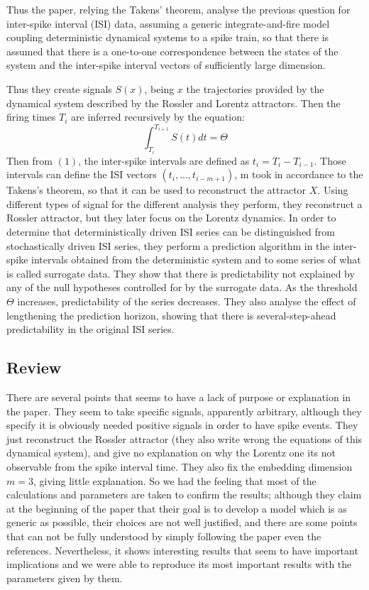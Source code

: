 \documentclass[10pt]{article}
\begin{document}
Thus the paper, relying the Takens' theorem, analyse the previous question for inter-spike interval (ISI) data, assuming a generic integrate-and-fire model coupling deterministic dynamical systems to a spike train, so that there is assumed that there is a one-to-one correspondence between the states of the system and the inter-spike interval vectors of sufficiently large dimension. 

Thus they create signals $S(x)$, being $x$ the trajectories provided by the dynamical system described by the Rossler and Lorentz attractors. Then the firing times $T_i$ are inferred recursively by the equation:
\begin{equation}
\int_{T_i}^{T_{i+1}} S(t)dt=\Theta
\end{equation}
Then from $(1)$, the inter-spike intervals are defined as $t_i = T_i - T_{i-1}$. Those intervals can define the ISI vectors $(t_i,...,t_{i-m+1})$, m took in accordance to the Takens's theorem, so that it can be used to reconstruct the attractor $X$. Using different types of signal for the different analysis they perform, they reconstruct a Rossler attractor, but they later focus on the Lorentz dynamics. In order to determine that deterministically driven ISI series can be distinguished from stochastically driven ISI series, they perform a prediction algorithm in the inter-spike intervals obtained from the deterministic system and to some series of what is called surrogate data. They show that there is predictability not explained by any of the null hypotheses controlled for by the surrogate data. As the threshold $\Theta$ increases, predictability of the series decreases. They also analyse the effect of lengthening the prediction horizon, showing that there is several-step-ahead predictability in the original ISI series.

\subsection{Review}

There are several points that seems to have a lack of purpose or explanation in the paper. They seem to take specific signals, apparently arbitrary, although they specify it is obviously needed positive signals in order to have spike events. They just reconstruct the Rossler attractor (they also write wrong the equations of this dynamical system), and give no explanation on why the Lorentz one its not observable from the spike interval time. They also fix the embedding dimension $m=3$, giving little explanation. So we had the feeling that most of the calculations and parameters are taken to confirm the results; although they claim at the beginning of the paper that their goal is to develop a model which is as generic as possible, their choices are not well justified, and there are some points that can not be fully understood by simply following the paper even the references. Nevertheless, it shows interesting results that seem to have important implications and we were able to reproduce its most important results with the parameters given by them.
\end{document}
